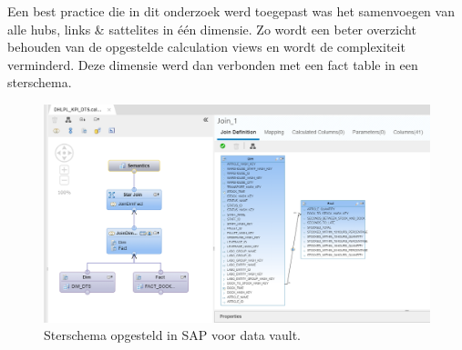 Een best practice die in dit onderzoek werd toegepast was het samenvoegen van alle hubs, links \& sattelites in één dimensie. Zo wordt een beter overzicht behouden van de opgestelde calculation views en wordt de complexiteit verminderd. Deze dimensie werd dan verbonden met een fact table in een sterschema. 

\begin{figure}[h]
	\centering
	\includegraphics[scale=0.45]{../images/DV_FG_datamart.png}
	\caption{Sterschema opgesteld in SAP voor data vault.}
	\label{fig:dvdm}
\end{figure}

